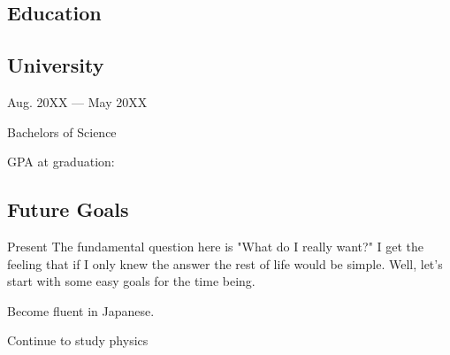 \documentclass[letterpaper]{easyCV}
\begin{document}
\begin{main}[10pt]
\section{Education}
\subsection{University}{Aug. 20XX --- May 20XX}
\begin{mainlist}
\item Bachelors of Science
\item GPA at graduation: 
\end{mainlist}

\subsection{Future Goals}{Present}
The fundamental question here is "What do I really want?"  I get the feeling that if I only knew the answer the rest of life would be simple.  Well, let's start with some easy goals for the time being.
\vspace{2mm}
\begin{mainlist}
\item Become fluent in Japanese.
\item  Continue to study physics
\end{mainlist}

\end{main}

\end{document}
